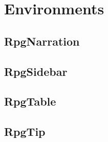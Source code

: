 \chapter{Environments}
	\newcommand\labelsection[1]
	{
		\section{#1}\label{S:#1}
	}

	
	\labelsection{RpgNarration}
	\labelsection{RpgSidebar}
	\labelsection{RpgTable}
	\labelsection{RpgTip}
